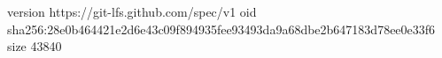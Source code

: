 version https://git-lfs.github.com/spec/v1
oid sha256:28e0b464421e2d6e43c09f894935fee93493da9a68dbe2b647183d78ee0e33f6
size 43840
